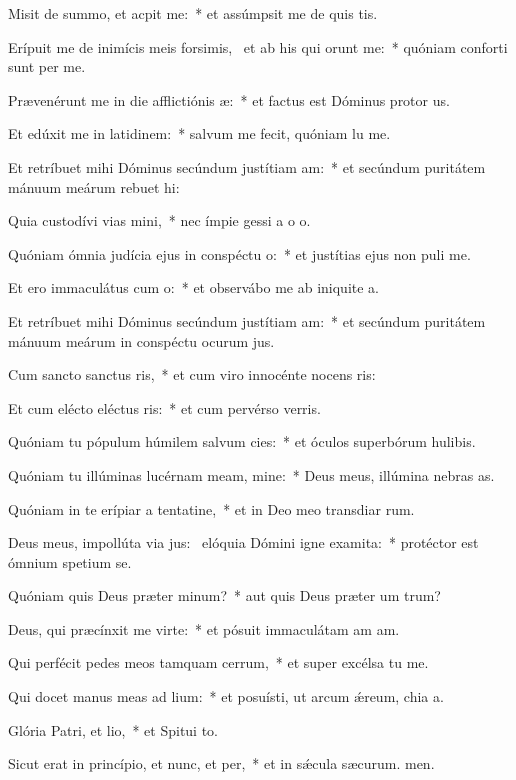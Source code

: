 \item Misit de summo, et acpit me:~* et assúmpsit me de quis tis.
\item Erípuit me de inimícis meis forsimis,~\pscross{} et ab his qui orunt me:~* quóniam conforti sunt per me.
\item Prævenérunt me in die afflictiónis æ:~* et factus est Dóminus protor us.
\item Et edúxit me in latidinem:~* salvum me fecit, quóniam lu me.
\item Et retríbuet mihi Dóminus secúndum justítiam am:~* et secúndum puritátem mánuum meárum rebuet hi:
\item Quia custodívi vias mini,~* nec ímpie gessi a o o.
\item Quóniam ómnia judícia ejus in conspéctu o:~* et justítias ejus non puli  me.
\item Et ero immaculátus cum o:~* et observábo me ab iniquite a.
\item Et retríbuet mihi Dóminus secúndum justítiam am:~* et secúndum puritátem mánuum meárum in conspéctu ocurum jus.
\item Cum sancto sanctus ris,~* et cum viro innocénte nocens ris:
\item Et cum elécto eléctus ris:~* et cum pervérso verris.
\item Quóniam tu pópulum húmilem salvum cies:~* et óculos superbórum hulibis.
\item Quóniam tu illúminas lucérnam meam, mine:~* Deus meus, illúmina nebras as.
\item Quóniam in te erípiar a tentatine,~* et in Deo meo transdiar rum.
\item Deus meus, impollúta via jus:~\pscross{} elóquia Dómini igne examita:~* protéctor est ómnium spetium  se.
\item Quóniam quis Deus præter minum?~* aut quis Deus præter um trum?
\item Deus, qui præcínxit me virte:~* et pósuit immaculátam am am.
\item Qui perfécit pedes meos tamquam cerrum,~* et super excélsa tu me.
\item Qui docet manus meas ad lium:~* et posuísti, ut arcum ǽreum, chia a.
\item Glória Patri, et lio,~* et Spitui to.
\item Sicut erat in princípio, et nunc, et per,~* et in sǽcula sæcurum. men.
